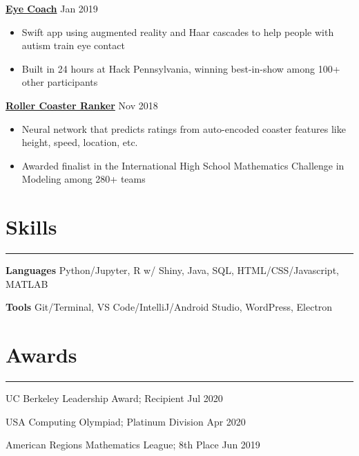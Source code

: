 \documentclass[11pt]{article}
\newcommand{\resumesection}[1]{\vspace{-0.3cm}\section*{\color{highlight}#1}\vspace{-0.3cm}\hrule\vspace{0.3cm}}
\begin{document}
\textbf{\href{https://github.com/gautomdas/eye-coach}{Eye Coach}} \hfill Jan 2019 \par

\begin{itemize}
	\item Swift app using augmented reality and Haar cascades to help people with autism train eye contact
	\item Built in 24 hours at Hack Pennsylvania, winning best-in-show among 100+ other participants
\end{itemize}\vspace{0.1cm} \par

\textbf{\href{https://github.com/prayaggordy/HiMCM}{Roller Coaster Ranker}}  \hfill Nov 2018\par

\begin{itemize}
	\item Neural network that predicts ratings from auto-encoded coaster features like height, speed, location, etc.
	\item Awarded finalist in the International High School Mathematics Challenge in Modeling among 280+ teams
\end{itemize}\par

\resumesection{Skills}

\textbf{Languages} Python/Jupyter, R w/ Shiny, Java, SQL, HTML/CSS/Javascript, MATLAB\par
\textbf{Tools} Git/Terminal, VS Code/IntelliJ/Android Studio, WordPress, Electron

\resumesection{Awards}

UC Berkeley Leadership Award; Recipient \hfill Jul 2020 \par
USA Computing Olympiad; Platinum Division \hfill Apr 2020 \par
American Regions Mathematics League; 8th Place \hfill Jun 2019 \par
\end{document}
